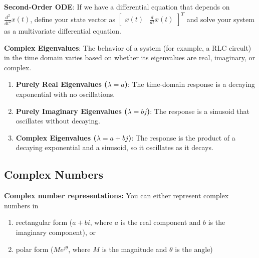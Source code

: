 \textbf{Second-Order ODE}: If we have a differential equation that depends on $\frac{d^2}{dt^2} x(t)$, define your state vector as $\begin{bmatrix} x(t) & \frac{d}{dt} x(t) \end{bmatrix}^T$ and solve your system as a multivariate differential equation.

\textbf{Complex Eigenvalues}: The behavior of a system (for example, a RLC circult) in the time domain varies based on whether its eigenvalues are real, imaginary, or complex.
\begin{enumerate}
    \item \textbf{Purely Real Eigenvalues ($\lambda = a$)}: The time-domain response is a decaying exponential with no oscillations.
    \item \textbf{Purely Imaginary Eigenvalues ($\lambda = bj$)}: The response is a sinusoid that oscillates without decaying.
    \item \textbf{Complex Eigenvalues ($\lambda = a + bj$)}: The response is the product of a decaying exponential and a sinusoid, so it oscillates as it decays.
\end{enumerate}

\newpage
\subsection*{Complex Numbers}
\textbf{Complex number representations:} You can either represent complex numbers in 
\begin{enumerate}
    \item rectangular form ($a + bi$, where $a$ is the real component and $b$ is the imaginary component), or
    \item polar form ($Me^{j \theta}$, where $M$ is the magnitude and $\theta$ is the angle)
\end{enumerate}

